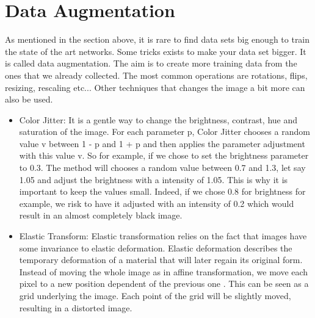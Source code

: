 \section{Data Augmentation} \label{sec:dataug}
As mentioned in the section above, it is rare to find data sets big enough to train the state of the art networks. Some tricks exists to make your data set bigger. It is called data augmentation. The aim is to create more training data from the ones that we already collected. The most common operations are rotations, flips, resizing, rescaling etc... Other techniques that changes the image a bit more can also be used.
\begin{itemize}
    \item Color Jitter: It is a gentle way to change the brightness, contrast, hue and saturation of the image. 
    For each parameter p, Color Jitter chooses a random value v between 1 - p and 1 + p and then applies the parameter adjustment with this value v. So for example, if we chose to set the brightness parameter to 0.3. The method will chooses a random value between 0.7 and 1.3, let say 1.05 and adjust the brightness with a intensity of 1.05. This is why it is important to keep the values small. Indeed, if we chose 0.8 for brightness for example, we risk to have it adjusted with an intensity of 0.2 which would result in an almost completely black image.
     \item Elastic Transform:   Elastic transformation relies on the fact  that images have some invariance to elastic deformation. Elastic deformation describes the temporary deformation of a material that will later regain its original form. Instead of moving the whole image as in affine transformation, we move each pixel to a new position dependent of the previous one \cite{elastic}. This can be seen as a grid underlying the image. Each point of the grid will be slightly moved, resulting in a distorted image. 
     \end{itemize}